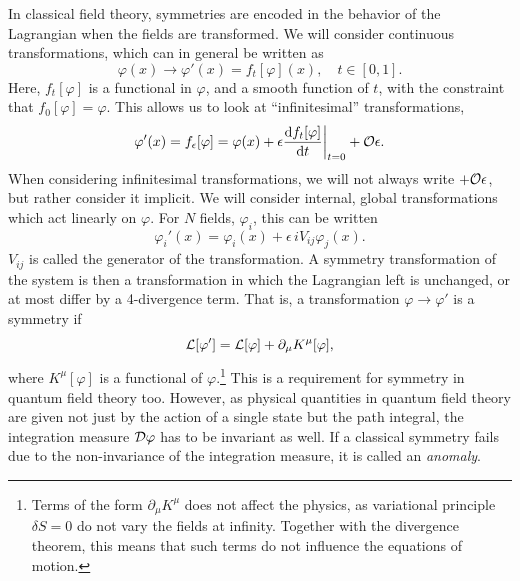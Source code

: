 In classical field theory, symmetries are encoded in the behavior of the Lagrangian when the fields are transformed.
We will consider continuous transformations, which can in general be written as
\begin{equation}
    \varphi(x) \longrightarrow \varphi'(x) = f_t[\varphi](x), \quad t \in [0, 1].
\end{equation}
%
Here, $f_t[\varphi]$ is a functional in $\varphi$, and a smooth function of $t$, with the constraint that $f_0[\varphi] = \varphi$.
This allows us to look at ``infinitesimal'' transformations,
\begin{equation}
    \label{infinitesimal transformation}
    \varphi'(x) = f_\epsilon[\varphi] 
    = \varphi(x) + \epsilon \odv{ f_t[\varphi] }{t}\bigg |_{t=0} + \Oh{\epsilon}.
\end{equation}
%
When considering infinitesimal transformations, we will not always write $ + \mathcal O{\epsilon}$, but rather consider it implicit.
We will consider internal, global transformations which act linearly on $\varphi$.
For $N$ fields, $\varphi_i$, this can be written
\begin{equation}
    \label{linear field transformation}
    \varphi_i'(x) = \varphi_i(x) + \epsilon \, i V_{ij} \varphi_j(x).
\end{equation}
%
$V_{ij}$ is called the generator of the transformation.
A symmetry transformation of the system is then a transformation in which the Lagrangian left is unchanged, or at most differ by a 4-divergence term.
That is, a transformation $\varphi \rightarrow \varphi'$ is a symmetry if 
\begin{equation}
    \mathcal{L}[\varphi'] = \mathcal{L}[\varphi] + \partial_\mu K^\mu[\varphi],
\end{equation}
%
where $K^\mu[\varphi]$ is a functional of $\varphi$.\footnote{Terms of the form $\partial_\mu K^\mu$ does not affect the physics, as variational principle $\delta S = 0$ do not vary the fields at infinity. Together with the divergence theorem, this means that such terms do not influence the equations of motion.}
This is a requirement for symmetry in quantum field theory too.
However, as physical quantities in quantum field theory are given not just by the action of a single state but the path integral, the integration measure $\mathcal D \varphi$ has to be invariant as well.
If a classical symmetry fails due to the non-invariance of the integration measure, it is called an \emph{anomaly}.

